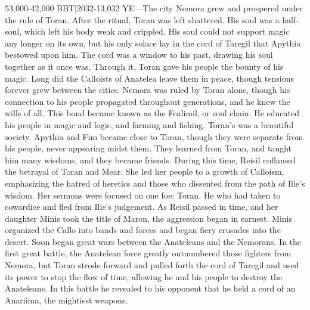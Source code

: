\documentclass[smalldemyvopaper,11pt,twoside,onecolumn,openright,extrafontsizes]{memoir}
\begin{document}
{{53,000-42,000 BBT|2032-13,032 YE—The city Nemora grew and prospered under the rule of Toran. After the ritual, Toran was left shattered. His soul was a half-soul, which left his body weak and crippled. His soul could not support magic any longer on its own, but his only solace lay in the cord of Taregil that Apythia bestowed upon him. The cord was a window to his past, drawing his soul together as it once was. Through it, Toran gave his people the bounty of his magic. Long did the Calloists of Anatelea leave them in peace, though tensions forever grew between the cities. Nemora was ruled by Toran alone, though his connection to his people propagated throughout generations, and he knew the wills of all. This bond became known as the Fealimil, or soul chain. He educated his people in magic and logic, and farming and fishing. Toran’s was a beautiful society. Apythia and Fim became close to Toran, though they were separate from his people, never appearing midst them. They learned from Toran, and taught him many wisdoms, and they became friends.
	During this time, Reisil enflamed the betrayal of Toran and Mear. She led her people to a growth of Calloism, emphasizing the hatred of heretics and those who dissented from the path of Ilie’s wisdom. Her sermons were focused on one foe: Toran. He who had taken to cowardice and fled from Ilie’s judgement. As Reisil passed in time, and her daughter Minis took the title of Maron, the aggression began in earnest. Minis organized the Callo into bands and forces and began fiery crusades into the desert. Soon began great wars between the Anateleans and the Nemorans. In the first great battle, the Anatelean force greatly outnumbered those fighters from Nemora, but Toran strode forward and pulled forth the cord of Taregil and used its power to stop the flow of time, allowing he and his people to destroy the Anateleans. In this battle he revealed to his opponent that he held a cord of an Anariima, the mightiest weapons.
}}
\end{document}

